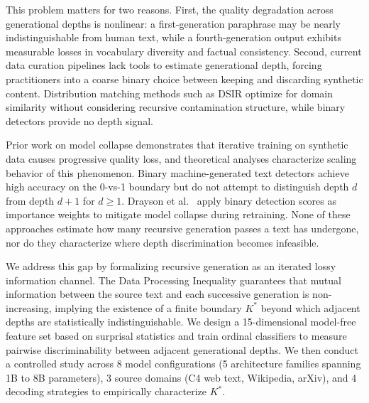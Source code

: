 \documentclass[11pt,a4paper]{article}
\newcommand{\Kstar}{K^{*}}
\begin{document}
This problem matters for two reasons. First, the quality degradation across generational depths is nonlinear: a first-generation paraphrase may be nearly indistinguishable from human text, while a fourth-generation output exhibits measurable losses in vocabulary diversity and factual consistency. Second, current data curation pipelines lack tools to estimate generational depth, forcing practitioners into a coarse binary choice between keeping and discarding synthetic content. Distribution matching methods such as DSIR \cite{xie2023dsir} optimize for domain similarity without considering recursive contamination structure, while binary detectors \cite{mitchell2023detectgpt,bao2024diveye} provide no depth signal.

Prior work on model collapse \cite{shumailov2024modelcollapse,alemohammad2024selfconsuming} demonstrates that iterative training on synthetic data causes progressive quality loss, and theoretical analyses \cite{dohmatob2024tale} characterize scaling behavior of this phenomenon. Binary machine-generated text detectors achieve high accuracy on the 0-vs-1 boundary but do not attempt to distinguish depth $d$ from depth $d+1$ for $d \geq 1$. Drayson et al.~\cite{drayson2025} apply binary detection scores as importance weights to mitigate model collapse during retraining. None of these approaches estimate how many recursive generation passes a text has undergone, nor do they characterize where depth discrimination becomes infeasible.

We address this gap by formalizing recursive generation as an iterated lossy information channel. The Data Processing Inequality guarantees that mutual information between the source text and each successive generation is non-increasing, implying the existence of a finite boundary $\Kstar$ beyond which adjacent depths are statistically indistinguishable. We design a 15-dimensional model-free feature set based on surprisal statistics and train ordinal classifiers to measure pairwise discriminability between adjacent generational depths. We then conduct a controlled study across 8 model configurations (5 architecture families spanning 1B to 8B parameters), 3 source domains (C4 web text, Wikipedia, arXiv), and 4 decoding strategies to empirically characterize $\Kstar$.
\end{document}
